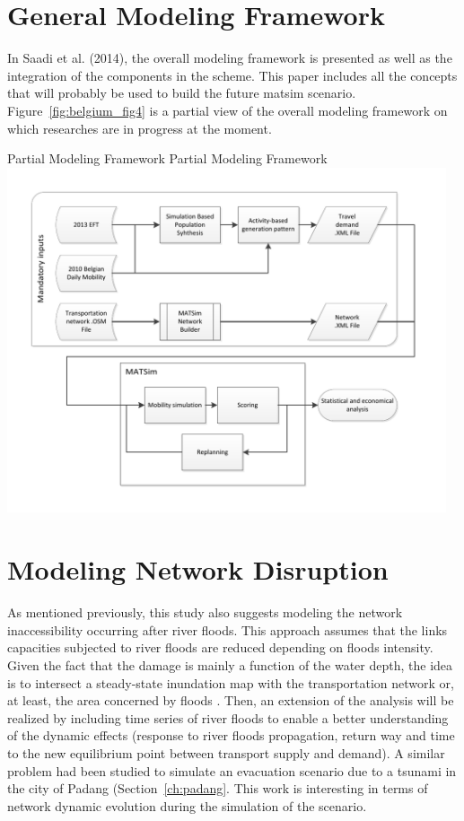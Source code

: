 \section{General Modeling Framework}
In Saadi et al. (2014), the overall modeling framework is presented as well as the integration of the components in the scheme. 
This paper includes all the concepts that will probably be used to build the future \gls{matsim} scenario. 
Figure~\ref{fig:belgium_fig4} is a partial view of the overall modeling framework on which researches are in progress at the moment.

\createfigure%
{Partial Modeling Framework}%
{Partial Modeling Framework}%
{\label{fig:belgium_fig4}}%
{\includegraphics[width=0.97\textwidth, angle=0]{scenarios/figures/belgium_fig4.pdf}}%
{}

\section{Modeling Network Disruption}
As mentioned previously, this study also suggests modeling the network inaccessibility occurring after river floods. 
This approach assumes that the links capacities subjected to river floods are reduced depending on floods intensity. 
Given the fact that the damage is mainly a function of the water depth, the idea is to intersect a steady-state inundation map with the transportation network or, at least, the area concerned by floods \citep[][]{SaadiEtAl_ICTTE_2014}. 
Then, an extension of the analysis will be realized by including time series of river floods to enable a better understanding of the dynamic effects (\eg response to river floods propagation, return way and time to the new equilibrium point between transport supply and demand). 
A similar problem had been studied to simulate an evacuation scenario due to a tsunami in the city of Padang \citep[][]{LaemmelGretherNagel2009TimeDependentNetworks} (Section~\ref{ch:padang}. 
This work is interesting in terms of network dynamic evolution during the simulation of the scenario.

